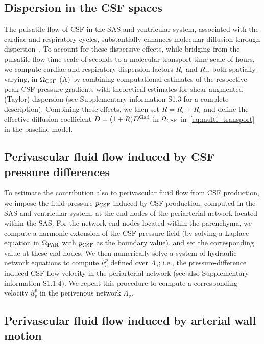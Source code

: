 \documentclass[fleqn,10pt]{wlscirep}
\begin{document}
\subsection*{Dispersion in the CSF spaces}

The pulsatile flow of CSF in the SAS and ventricular system,
associated with the cardiac and respiratory cycles, substantially
enhances molecular diffusion through
dispersion~\cite{taylor1953dispersion, watson1983diffusion,
  asgari2016glymphatic, sharp2019dispersion, ray2021quantitative,
  troyetsky2021dispersion}. To account for these dispersive effects,
while bridging from the pulsatile flow time scale of seconds to a
molecular transport time scale of hours, we compute cardiac and
respiratory dispersion factors $R_c$ and $R_r$, both
spatially-varying, in $\Omega_{\rm CSF}$ (A) by
combining computational estimates of the respective peak CSF pressure
gradients with theoretical estimates for shear-augmented (Taylor)
dispersion \cite{taylor1953dispersion, watson1983diffusion,
  sharp2019dispersion} (see Supplementary information S1.3 for a
complete description). Combining these effects, we then set $R = R_c +
R_r$ and define the effective diffusion coefficient $D = (1 + R)
D^{\rm Gad}$ in $\Omega_{\rm CSF}$ in~\eqref{eq:multi_transport} in
the baseline model.

\subsection*{Perivascular fluid flow induced by CSF pressure differences}

To estimate the contribution also to perivascular fluid flow from CSF
production, we impose the fluid pressure $p_{\rm CSF}$ induced by CSF
production, computed in the SAS and ventricular system, at the end
nodes of the periarterial network located within the SAS. For the
network end nodes located within the parenchyma, we compute a harmonic
extension of the CSF pressure field (by solving a Laplace equation in
$\Omega_{\rm PAR}$ with $p_{\rm CSF}$ as the boundary value), and set
the corresponding value at these end nodes. We then numerically solve
a system of hydraulic network equations to compute $\hat{u}^p_a$
defined over $\Lambda_a$; i.e., the pressure-difference induced CSF
flow velocity in the periarterial network (see
also Supplementary information S1.1.4). We repeat this procedure to
compute a corresponding velocity $\hat{u}^p_v$ in the perivenous
network $\Lambda_v$. 

\subsection*{Perivascular fluid flow induced by arterial wall motion}
\end{document}
